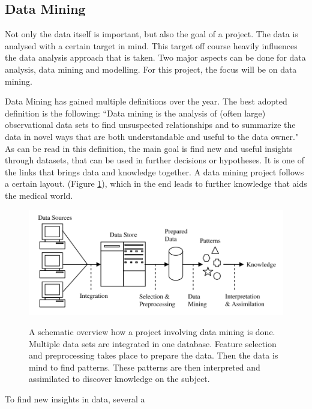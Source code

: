 \documentclass[10pt,a4paper]{article}
\begin{document}
	\subsection{Data Mining}
	\label{subsec:DataMining}
	
	Not only the data itself is important, but also the goal of a project. The data is analysed with a certain target in mind. This target off course heavily influences the data analysis approach that is taken. Two major aspects can be done for data analysis, data mining and modelling. For this project, the focus will be on data mining.
	
	Data Mining has gained multiple definitions over the year. The best adopted definition is the following: “Data mining is the analysis of (often large) observational data sets to find unsuspected relationships and to summarize the data in novel ways that are both understandable and useful to the data owner." \cite{hand2001principles} As can be read in this definition, the main goal is find new and useful insights through datasets, that can be used in further decisions or hypotheses. It is one of the links that brings data and knowledge together.\cite{Yoo2012} A data mining project follows a certain layout. (Figure \ref{fig:ResearchSteps}), which in the end leads to further knowledge that aids the medical world.\cite{bramer2007principles} 
	
	\begin{figure}
		\includegraphics[scale=1.0]{ResearchSteps.png}
		\label{fig:ResearchSteps}
		\caption{A schematic overview how a project involving data mining is done. Multiple data sets are integrated in one database. Feature selection and preprocessing takes place to prepare the data. Then the data is mind to find patterns. These patterns are then interpreted and assimilated to discover knowledge on the subject.\cite{bramer2007principles}}
	\end{figure}
	
	To find new insights in data, several a
	
\end{document}
